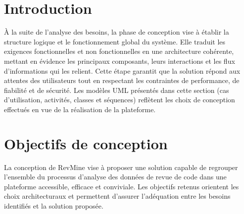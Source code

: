 
\section{Introduction}

À la suite de l’analyse des besoins, la phase de conception vise à établir la structure logique et le fonctionnement global du système. Elle traduit les exigences fonctionnelles et non fonctionnelles en une architecture cohérente, mettant en évidence les principaux composants, leurs interactions et les flux d’informations qui les relient. Cette étape garantit que la solution répond aux attentes des utilisateurs tout en respectant les contraintes de performance, de fiabilité et de sécurité. Les modèles UML présentés dans cette section (cas d’utilisation, activités, classes et séquences) reflètent les choix de conception effectués en vue de la réalisation de la plateforme.


\section{Objectifs de conception}
La conception de RevMine vise à proposer une solution capable de regrouper l’ensemble du processus d’analyse des données de revue de code dans une plateforme accessible, efficace et conviviale. Les objectifs retenus orientent les choix architecturaux et permettent d’assurer l’adéquation entre les besoins identifiés et la solution proposée.

\vspace{0.5cm}

